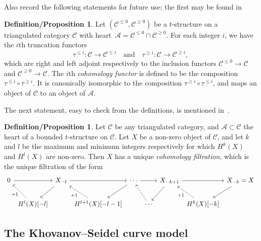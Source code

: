 \documentclass{amsart}
\theoremstyle{definition}
\newtheorem{defprop}[theorem]{Definition/Proposition}
\newcommand{\darkblue}{\color{darkblue}} %
\newcommand{\defn}[1]{\textsl{\darkblue #1}} %
\begin{document}
Also record the following statements for future use; the first may be found in~\cite[Sect.~1.3]{bel.ber.del:82}
\begin{defprop}\label{defprop:cohomology}
  Let \((\mathcal{C}^{\le 0}, \mathcal{C}^{\geq 0})\) be a \(t\)-structure on a triangulated category \(\mathcal{C}\) with heart~\(\mathcal{A} = \mathcal{C}^{\leq 0} \cap \mathcal{C}^{\geq 0}\).
  For each integer \(i\), we have the \(i\)th truncation functors
  \[\tau^{\leq i} \colon \mathcal{C} \to \mathcal{C}^{\leq i} \quad\text{and}\quad \tau^{\geq i} \colon \mathcal{C} \to \mathcal{C}^{\geq i},\]
  which are right and left adjoint respectively to the inclusion functors \(\mathcal{C}^{\leq 0} \to \mathcal{C}\) and \(\mathcal{C}^{\geq 0} \to \mathcal{C}\).
  The \(i\)th \defn{cohomology functor} is defined to be the composition \(\tau^{\leq i} \circ \tau^{\geq i}\).
  It is canonically isomorphic to the composition \(\tau^{\geq i} \circ \tau^{\leq i}\), and maps an object of \(\mathcal{C}\) to an object of \(\mathcal{A}\).
\end{defprop}
The next statement, easy to check from the definitions, is mentioned in~\cite[Sect.~3.3]{bayer2011tour}.
\begin{defprop}\label{defprop:cohomology-filtration}
  Let \(\mathcal{C}\) be any triangulated category, and \(\mathcal{A} \subset \mathcal{C}\) the heart of a bounded \(t\)-structure on \(\mathcal{C}\).
  Let \(X\) be a non-zero object of \(\mathcal{C}\), and let \(k\) and \(l\) be the maximum and minimum integers respectively for which \(H^k(X)\) and \(H^{l}(X)\) are non-zero.
  Then \(X\) has a unique \defn{cohomology filtration}, which is the unique filtration of the form
  \[
    \begin{tikzcd}[column sep=0.1cm]
      0  \arrow{rr} && X_{-l} \arrow{dl} \arrow{rr} && \cdots \arrow{rr} \arrow{dl} && X_{-k+1} \arrow{rr} \arrow{dl} && X_{-k} = X \arrow{dl}\\
      & H^l(X)[-l] \arrow[dashed]{ul}{+1} && H^{l+1}(X)[-l-1] \arrow[dashed]{ul}{+1} && \cdots \arrow[dashed]{ul} &&H^k(X)[-k] \arrow[dashed]{ul}{+1}
    \end{tikzcd}
  \]  
\end{defprop}


\subsection{The Khovanov--Seidel curve model}
\end{document}
